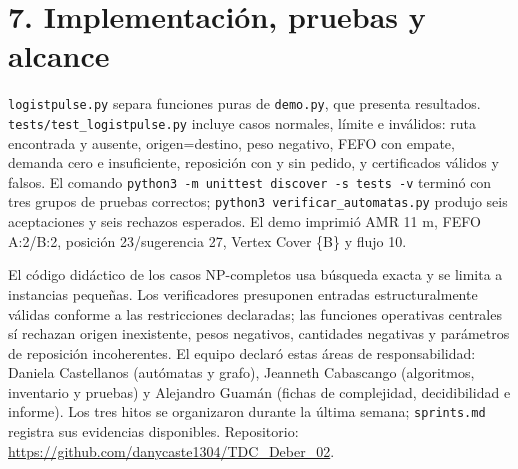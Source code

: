 \documentclass[12pt,a4paper]{article}
\begin{document}
\section{7. Implementación, pruebas y alcance}

\texttt{logistpulse.py} separa funciones puras de \texttt{demo.py}, que presenta resultados. \texttt{tests/test\_logistpulse.py} incluye casos normales, límite e inválidos: ruta encontrada y ausente, origen=destino, peso negativo, FEFO con empate, demanda cero e insuficiente, reposición con y sin pedido, y certificados válidos y falsos. El comando \texttt{python3 -m unittest discover -s tests -v} terminó con tres grupos de pruebas correctos; \texttt{python3 verificar\_automatas.py} produjo seis aceptaciones y seis rechazos esperados. El demo imprimió AMR 11 m, FEFO A:2/B:2, posición 23/sugerencia 27, Vertex Cover \{B\} y flujo 10.


El código didáctico de los casos NP-completos usa búsqueda exacta y se limita a instancias pequeñas. Los verificadores presuponen entradas estructuralmente válidas conforme a las restricciones declaradas; las funciones operativas centrales sí rechazan origen inexistente, pesos negativos, cantidades negativas y parámetros de reposición incoherentes. El equipo declaró estas áreas de responsabilidad: Daniela Castellanos (autómatas y grafo), Jeanneth Cabascango (algoritmos, inventario y pruebas) y Alejandro Guamán (fichas de complejidad, decidibilidad e informe). Los tres hitos se organizaron durante la última semana; \texttt{sprints.md} registra sus evidencias disponibles. Repositorio: \url{https://github.com/danycaste1304/TDC_Deber_02}.
\end{document}
